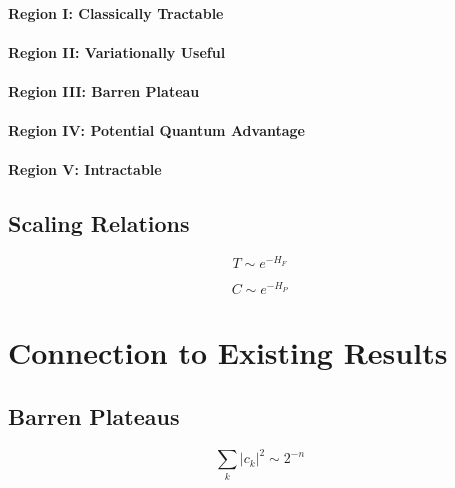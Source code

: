 \documentclass[11pt]{article}
\begin{document}
\paragraph{Region I: Classically Tractable}

\paragraph{Region II: Variationally Useful}

\paragraph{Region III: Barren Plateau}

\paragraph{Region IV: Potential Quantum Advantage}

\paragraph{Region V: Intractable}

\subsection{Scaling Relations}

\begin{equation}
T \sim e^{-H_F}
\end{equation}

\begin{equation}
C \sim e^{-H_P}
\end{equation}


\section{Connection to Existing Results}

\subsection{Barren Plateaus}

\begin{equation}
\sum_k |c_k|^2 \sim 2^{-n}
\end{equation}
\end{document}

